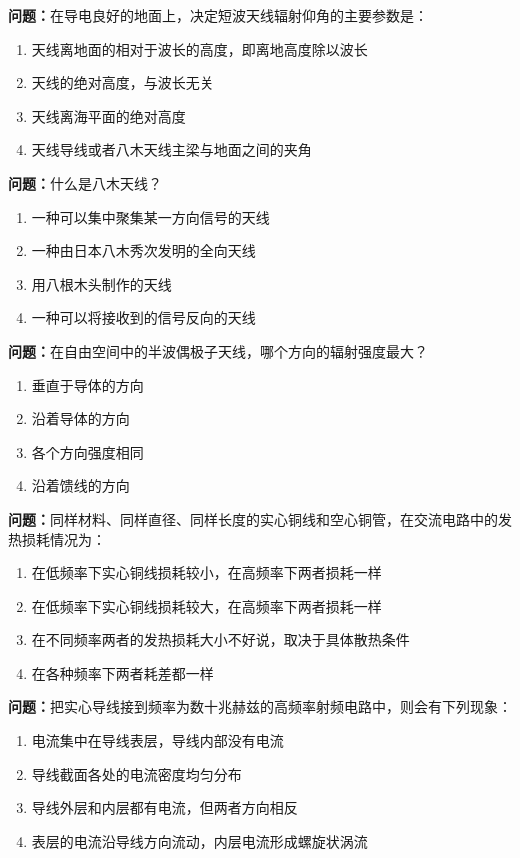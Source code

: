 \bigskip


\noindent\textbf{问题：}在导电良好的地面上，决定短波天线辐射仰角的主要参数是：
\begin{enumerate}[label=\Alph*), leftmargin=3em]
\item 天线离地面的相对于波长的高度，即离地高度除以波长
\item 天线的绝对高度，与波长无关
\item 天线离海平面的绝对高度
\item 天线导线或者八木天线主梁与地面之间的夹角
\end{enumerate}

\bigskip


\noindent\textbf{问题：}什么是八木天线？
\begin{enumerate}[label=\Alph*), leftmargin=3em]
\item 一种可以集中聚集某一方向信号的天线
\item 一种由日本八木秀次发明的全向天线
\item 用八根木头制作的天线
\item 一种可以将接收到的信号反向的天线
\end{enumerate}

\bigskip


\noindent\textbf{问题：}在自由空间中的半波偶极子天线，哪个方向的辐射强度最大？
\begin{enumerate}[label=\Alph*), leftmargin=3em]
\item 垂直于导体的方向
\item 沿着导体的方向
\item 各个方向强度相同
\item 沿着馈线的方向
\end{enumerate}

\bigskip


\noindent\textbf{问题：}同样材料、同样直径、同样长度的实心铜线和空心铜管，在交流电路中的发热损耗情况为：
\begin{enumerate}[label=\Alph*), leftmargin=3em]
\item 在低频率下实心铜线损耗较小，在高频率下两者损耗一样
\item 在低频率下实心铜线损耗较大，在高频率下两者损耗一样
\item 在不同频率两者的发热损耗大小不好说，取决于具体散热条件
\item 在各种频率下两者耗差都一样
\end{enumerate}

\bigskip


\noindent\textbf{问题：}把实心导线接到频率为数十兆赫兹的高频率射频电路中，则会有下列现象：
\begin{enumerate}[label=\Alph*), leftmargin=3em]
\item 电流集中在导线表层，导线内部没有电流
\item 导线截面各处的电流密度均匀分布
\item 导线外层和内层都有电流，但两者方向相反
\item 表层的电流沿导线方向流动，内层电流形成螺旋状涡流
\end{enumerate}

